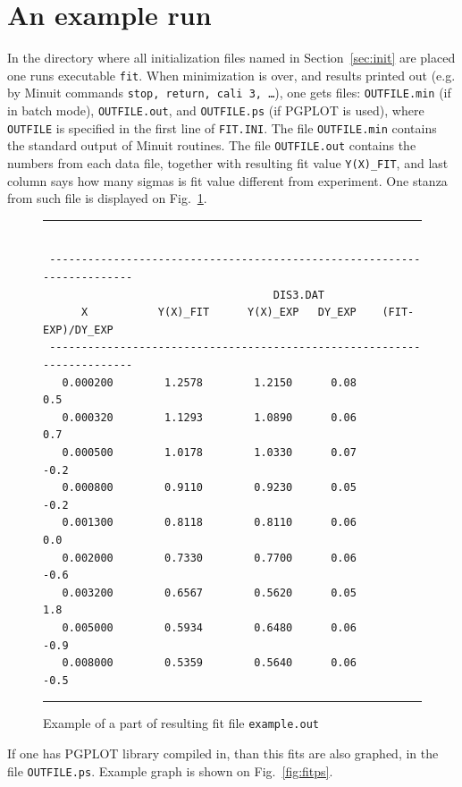 \documentclass[12pt]{article}
\begin{document}
\section{An example run}

In the directory where all initialization files named in Section~\ref{sec:init} are
placed one runs executable \texttt{fit}. When minimization is over, and results
printed out (e.g. by Minuit commands \texttt{stop, return, cali 3, \dots}), one gets
files: \texttt{OUTFILE.min} (if in batch mode),
\texttt{OUTFILE.out}, and \texttt{OUTFILE.ps} (if PGPLOT is used), where \texttt{OUTFILE}
is specified in the first line of \texttt{FIT.INI}.
The file \texttt{OUTFILE.min} contains the standard output of Minuit routines.
The file \texttt{OUTFILE.out} contains the numbers from each data file, together with
resulting fit value \texttt{Y(X)\_FIT},
and last column says how many sigmas is fit value different from experiment.
One stanza from such file is displayed on Fig.~\ref{fig:fitout}.

\begin{figure}
\begin{center}
\hrule
\small
\begin{verbatim}

 ------------------------------------------------------------------------
                                    DIS3.DAT                         
      X           Y(X)_FIT      Y(X)_EXP   DY_EXP    (FIT-EXP)/DY_EXP 
 ------------------------------------------------------------------------ 
   0.000200        1.2578        1.2150      0.08         0.5
   0.000320        1.1293        1.0890      0.06         0.7
   0.000500        1.0178        1.0330      0.07        -0.2
   0.000800        0.9110        0.9230      0.05        -0.2
   0.001300        0.8118        0.8110      0.06         0.0
   0.002000        0.7330        0.7700      0.06        -0.6
   0.003200        0.6567        0.5620      0.05         1.8
   0.005000        0.5934        0.6480      0.06        -0.9
   0.008000        0.5359        0.5640      0.06        -0.5 

\end{verbatim}
\hrule
\end{center}
\caption{Example of a part of resulting fit file \texttt{example.out}}
\label{fig:fitout}
\end{figure}

If one has PGPLOT library compiled in, than this fits are also graphed,
in the file \texttt{OUTFILE.ps}. Example graph is shown on Fig.~\ref{fig:fitps}.
\end{document}
